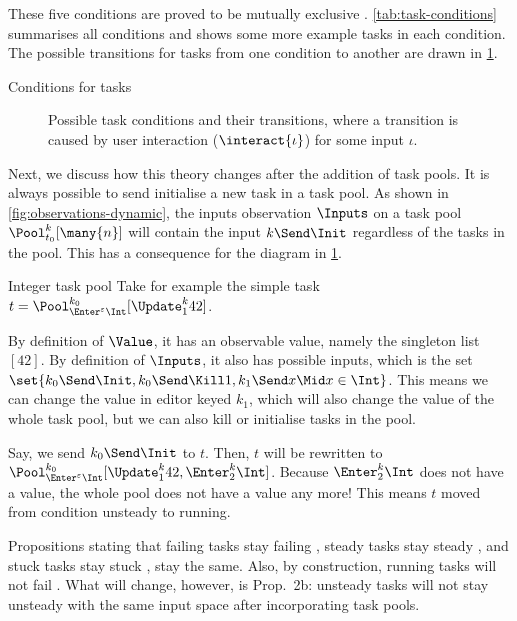 These five conditions are proved to be mutually exclusive .
\cref{tab:task-conditions} summarises all conditions
and shows some more example tasks in each condition.
The possible transitions for tasks from one condition to another are drawn in \cref{fig:task-conditions}.

\begin{table}
  
  \caption{Conditions for tasks}
  \label{tab:task-conditions}
\end{table}

\begin{figure}
  
  \caption{Possible task conditions and their transitions, where a transition is caused by user interaction ($\interact{\iota}$) for some input $\iota$.}
  \label{fig:task-conditions}
\end{figure}

Next, we discuss how this theory changes after the addition of task pools.
It is always possible to send initialise a new task in a task pool.
As shown in \cref{fig:observations-dynamic},
the inputs observation $\Inputs$ on a task pool $\Pool_{t_0}^k [\many{n}]$ will contain the input $k\Send\Init$
regardless of the tasks in the pool.
This has a consequence for the diagram in \cref{fig:task-conditions}.

\begin{example}{Integer task pool}
  Take for example the simple task $t = \Pool_{\Enter^\epsilon \Int}^{k_0} [\Update^k_1 42]$.

  By definition of $\Value$, it has an observable value, namely the singleton list $[42]$.
  By definition of $\Inputs$, it also has possible inputs,
  which is the set $\set{k_0\Send\Init, k_0\Send\Kill1, k_1\Send x \Mid x\in\Int}$.
  This means we can change the value in editor keyed $k_1$,
  which will also change the value of the whole task pool,
  but we can also kill or initialise tasks in the pool.

  Say, we send $k_0\Send\Init$ to $t$.
  Then, $t$ will be rewritten to $\Pool_{\Enter^\epsilon \Int}^{k_0} [\Update^k_1 42, \Enter^k_2\Int]$.
  Because $\Enter^k_2\Int$ does not have a value,
  the whole pool does not have a value any more!
  This means $t$ moved from condition unsteady to running.
\end{example}

Propositions stating that failing tasks stay failing ,
steady tasks stay steady ,
and stuck tasks stay stuck ,
stay the same.
Also, by construction, running tasks will not fail .
What will change, however, is Prop.~2b:
unsteady tasks will not stay unsteady with the same input space after incorporating task pools.

